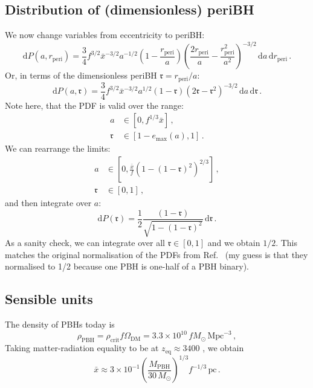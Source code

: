 \documentclass[a4paper,11pt]{article}
\newcommand{\rperi}{r_\mathrm{peri}}
\begin{document}
\subsection{Distribution of  (dimensionless) periBH}

We now change variables from eccentricity to periBH:
\begin{equation}
\label{eq:PDF_periBH}
\mathrm{d}P(a, \rperi) = \frac{3}{4} f^{3/2} \bar{x}^{-3/2} a^{-1/2} \left(1-\frac{\rperi}{a}\right)\left(\frac{2\rperi}{a} - \frac{\rperi^2}{a^2}\right)^{-3/2}\,\mathrm{d}a\,\mathrm{d}\rperi\,.
\end{equation}
Or, in terms of the dimensionless periBH $\mathfrak{r} = \rperi/a$:
\begin{equation}
\mathrm{d}P(a, \mathfrak{r}) = \frac{3}{4} f^{3/2} \bar{x}^{-3/2} a^{1/2} \left(1-\mathfrak{r}\right)\left(2 \mathfrak{r} - \mathfrak{r}^2\right)^{-3/2}\,\mathrm{d}a\,\mathrm{d}\mathfrak{r}\,.
\end{equation}
Note here, that the PDF is valid over the range:
\begin{align}
a &\in [0, f^{1/3} \bar{x}]\,,\\
\mathfrak{r} &\in [1 - e_\mathrm{max}(a), 1]\,.
\end{align}
We can rearrange the limits:
\begin{align}
a &\in [0, \frac{\bar{x}}{f} \left(1 - (1-\mathfrak{r})^2\right)^{2/3}]\,,\\
\mathfrak{r} &\in [0, 1]\,,
\end{align}
and then integrate over $a$:
\begin{equation}
\mathrm{d}P(\mathfrak{r}) = \frac{1}{2} \frac{\left(1-\mathfrak{r}\right)}{\sqrt{1- (1-\mathfrak{r})^2}}\,\mathrm{d}\mathfrak{r}\,.
\end{equation}
As a sanity check, we can integrate over all $\mathfrak{r} \in [0, 1]$ and we obtain $1/2$. This matches the original normalisation of the PDFs from Ref.~\cite{Sasaki:2016jop} (my guess is that they normalised to 1/2 because one PBH is one-half of a PBH binary).


\subsection{Sensible units}

The density of PBHs today is \cite{Lahav:2014vza,Ade:2015xua}
\begin{equation}
\rho_{\mathrm{PBH}} = \rho_\mathrm{crit} f \Omega_{\mathrm{DM}} = 3.3 \times 10^{10} \, f M_\odot \, \mathrm{Mpc}^{-3}\,,
\end{equation}
Taking matter-radiation equality to be at $z_\mathrm{eq} \approx 3400$ \cite{Ade:2015xua}, we obtain
\begin{equation}
\bar{x} \approx 3 \times 10^{-1} \left( \frac{M_{\mathrm{PBH}}}{30 \,M_\odot}\right)^{1/3}{f}^{-1/3} \, \mathrm{pc}\,.
\end{equation}
\end{document}

